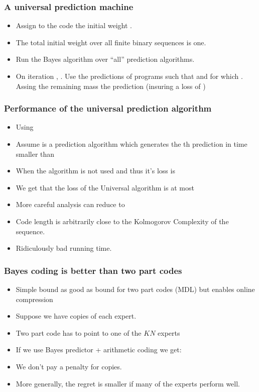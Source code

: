 \documentclass[handout]{beamer}
\begin{document}
\begin{frame}
\frametitle{A universal prediction machine}
\begin{itemize}
\item Assign to the code \R{$\vb$} the initial weight .
\item The total initial weight over all finite binary sequences is one.
\item Run the Bayes algorithm over ``all'' prediction algorithms.
\item {} On iteration , . 
Use the predictions of 
programs \R{$\vb$} such that  and for which . Assing the remaining mass the prediction  (insuring a loss of )
\end{itemize}
\end{frame}

\begin{frame}
\frametitle{Performance of the universal prediction algorithm}
\begin{itemize}
\item Using 
\item Assume  is a prediction algorithm which generates the 
th prediction in time smaller than 
\item When  the algorithm is not used and thus it's loss is 
\item We get that the loss of the Universal algorithm is at most 
\item More careful analysis can reduce  to 
\item Code length is arbitrarily close to the Kolmogorov Complexity of the sequence.
\item Ridiculously bad running time.
\end{itemize}
\end{frame}

\begin{frame}
\frametitle{Bayes coding is better than two part codes}
\begin{itemize}
\item
Simple bound as good as bound for two part codes (MDL) 
but enables online compression
\item Suppose we have  copies of each expert.
\item Two part code has to point to one of the $KN$ experts
\item If we use Bayes predictor + arithmetic coding we get:
\item We don't pay a penalty for copies.
\item More generally, the regret is smaller if many of the experts perform well.
\end{itemize}
\end{frame}
\end{document}
